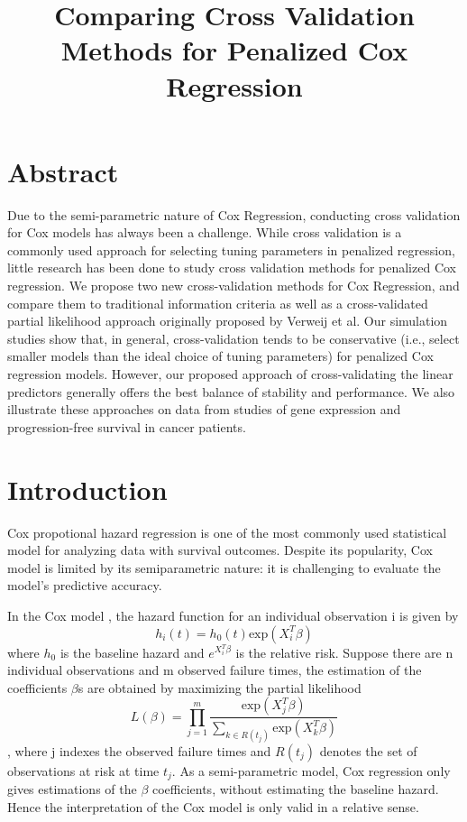 \documentclass{article}\usepackage[]{graphicx}\usepackage[]{color}
\title{Comparing Cross Validation Methods for Penalized Cox Regression}
\author{
}
\date{ }
\begin{document}
\maketitle

\section*{Abstract}
Due to the semi-parametric nature of Cox Regression, conducting cross validation for Cox models has always been a challenge. While cross validation is a commonly used approach for selecting tuning parameters in penalized regression, little research has been done to study cross validation methods for penalized Cox regression. We propose two new cross-validation methods for Cox Regression, and compare them to traditional information criteria as well as a cross-validated partial likelihood approach originally proposed by Verweij et al. Our simulation studies show that, in general, cross-validation tends to be conservative (i.e., select smaller models than the ideal choice of tuning parameters) for penalized Cox regression models. However, our proposed approach of cross-validating the linear predictors generally offers the best balance of stability and performance. We also illustrate these approaches on data from studies of gene expression and progression-free survival in cancer patients.

\section{Introduction}
Cox propotional hazard regression is one of the most commonly used statistical model for analyzing data with survival outcomes. Despite its popularity, Cox model is limited by its semiparametric nature: it is challenging to evaluate the model's predictive accuracy.

In the Cox model \citep{Cox1975}, the hazard function for an individual observation i is given by \begin{equation}h_{i}(t) = h_{0}(t) \text{exp}( X_{i}^{T} \beta)\end{equation} where $h_{0}$ is the baseline hazard and $e^{X_{i}^{T} \beta}$ is the relative risk. Suppose there are n individual observations and m observed failure times, the estimation of the coefficients $\beta$s are obtained by maximizing the partial likelihood \begin{equation}L(\beta) = \prod_{j=1}^{m} \frac{\text{exp} ( X_{j}^{T} \beta)}{\sum_{ k \in R(t_{j})}\text{exp} ( X_{k}^{T} \beta)}\end{equation}, where j indexes the observed failure times and $R(t_{j})$ denotes the set of observations at risk at time $t_{j}$. As a semi-parametric model, Cox regression only gives estimations of the $\beta$ coefficients, without estimating the baseline hazard. Hence the interpretation of the Cox model is only valid in a relative sense.
\end{document}
